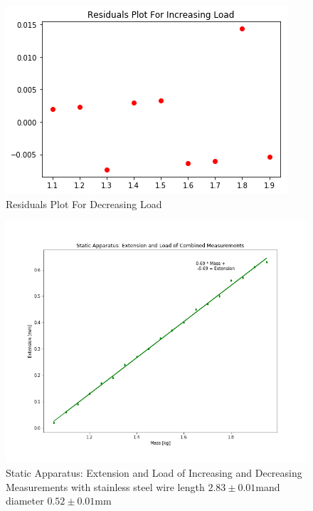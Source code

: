 \documentclass[]{article}
\newcommand{\staticWireDiameter}{\ensuremath{0.52 \pm 0.01 \si{\milli\meter}}}
\newcommand{\staticWireLength}{\ensuremath{2.83 \pm 0.01 \si{\meter}}}
\begin{document}
\begin{figure}[H]
    \includegraphics[width=\textwidth]{../output/residualsincrease.png}
    \caption{Residuals Plot For Decreasing Load}\label{fig:increaseresidual}
\end{figure}

\begin{figure}[H]
    \includegraphics[width=\textwidth]{../output/combinedstaticgraph.png}
    \caption{Static Apparatus: Extension and Load of Increasing and Decreasing
    Measurements with stainless steel wire length \staticWireLength and diameter
    \staticWireDiameter}\label{fig:combined}
\end{figure}
\end{document}
